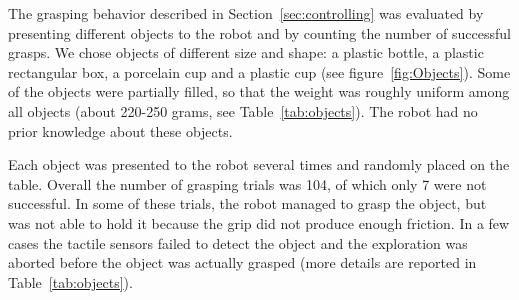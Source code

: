

The grasping behavior described in Section~\ref{sec:controlling}
was evaluated by presenting different objects to the robot and by
counting the number of successful grasps. We chose objects of
different size and shape: a plastic bottle, a plastic rectangular
box, a porcelain cup and a plastic cup (see
figure~\ref{fig:Objects}). Some of the objects were partially
filled, so that the weight was roughly uniform among all objects
(about 220-250 grams, see Table~\ref{tab:objects}). The robot had 
no prior knowledge about these objects. 

Each object was presented to the robot several times and 
randomly placed on the table. Overall the number of grasping
trials was 104, of which only 7 were not successful. In some of
these trials, the robot managed to grasp the object, but was not
able to hold it because the grip did not produce enough friction.
In a few cases the tactile sensors failed to detect the object and
the exploration was aborted before the object was actually
grasped (more details are reported in Table~\ref{tab:objects}).

